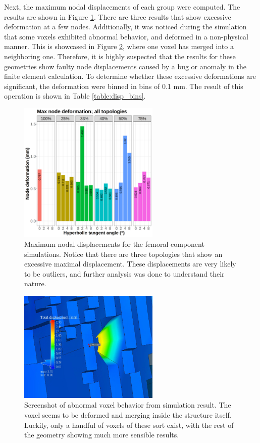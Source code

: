 \documentclass[../main.tex]{subfiles}
\begin{document}
Next, the maximum nodal displacements of each group were computed. The results are shown in Figure \ref{fig:disp_max_bad}. There are three results that show excessive deformation at a few nodes. Additionally, it was noticed during the simulation that some voxels exhibited abnormal behavior, and deformed in a non-physical manner. This is showcased in Figure \ref{fig:bad_voxel}, where one voxel has merged into a neighboring one. Therefore, it is highly suspected that the results for these geometries show faulty node displacements caused by a bug or anomaly in the finite element calculation. To determine whether these excessive deformations are significant, the deformation were binned in bins of 0.1 mm. The result of this operation is shown in  Table \ref{table:disp_bins}.

\begin{figure}[h!]
  \centering
  \includegraphics[width=0.6\textwidth]{images/results/plots/femoral/displacement/femoral_max_bad.png}
  \caption{Maximum nodal displacements for the femoral component simulations. Notice that there are three topologies that show an excessive maximal displacement. These displacements are very likely to be outliers, and further analysis was done to understand their nature.}
  \label{fig:disp_max_bad}
\end{figure}

\begin{figure}[h!]
  \centering
  \includegraphics[width=0.6\textwidth]{images/bad_voxel.png}
  \caption{Screenshot of abnormal voxel behavior from simulation result. The voxel seems to be deformed and merging inside the structure itself. Luckily, only a handful of voxels of these sort exist, with the rest of the geometry showing much more sensible results.}
  \label{fig:bad_voxel}
\end{figure}
\end{document}
